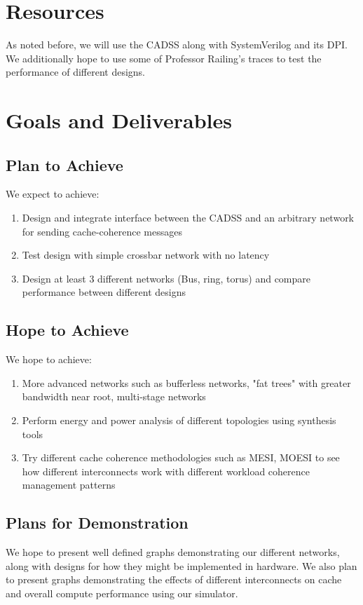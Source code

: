 \documentclass{article}
\begin{document}
\section{Resources}
As noted before, we will use the CADSS along with SystemVerilog and its DPI. We additionally hope to use some of Professor Railing's traces to test the performance of different designs. 

\section{Goals and Deliverables}
\subsection{Plan to Achieve}
We expect to achieve:
\begin{enumerate}
    \item Design and integrate interface between the CADSS and an arbitrary network for sending cache-coherence messages
    \item Test design with simple crossbar network with no latency 
    \item Design at least 3 different networks (Bus, ring, torus) and compare performance between different designs
\end{enumerate}
\subsection{Hope to Achieve}
We hope to achieve:
\begin{enumerate}
    \item More advanced networks such as bufferless networks, "fat trees" with greater bandwidth near root, multi-stage networks
    \item Perform energy and power analysis of different topologies using synthesis tools
    \item Try different cache coherence methodologies such as MESI, MOESI to see how different interconnects work with different workload coherence management patterns
\end{enumerate}

\subsection{Plans for Demonstration}

We hope to present well defined graphs demonstrating our different networks, along with designs for how they might be implemented in hardware. We also plan to present graphs demonstrating the effects of different interconnects on cache and overall compute performance using our simulator. 
\end{document}
